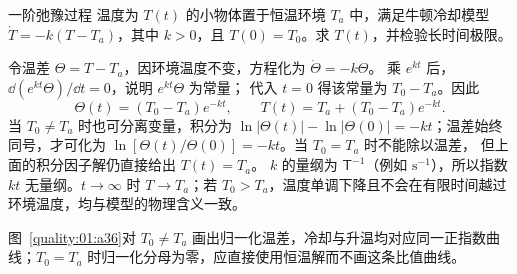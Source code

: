 \begin{origexamplebox}{一阶弛豫过程}
温度为 $T(t)$ 的小物体置于恒温环境 $T_a$ 中，满足牛顿冷却模型
$\dot T=-k(T-T_a)$，其中 $k>0$，且 $T(0)=T_0$。求 $T(t)$，并检验长时间极限。

\end{origexamplebox}
\begin{xesolution}
令温差 $\Theta=T-T_a$，因环境温度不变，方程化为 $\dot\Theta=-k\Theta$。
乘 $e^{kt}$ 后，$\dd(e^{kt}\Theta)/\dd t=0$，说明 $e^{kt}\Theta$ 为常量；
代入 $t=0$ 得该常量为 $T_0-T_a$。因此
\[
 \Theta(t)=(T_0-T_a)e^{-kt},\qquad
 \boxed{T(t)=T_a+(T_0-T_a)e^{-kt}}.
\]
当 $T_0\ne T_a$ 时也可分离变量，积分为
$\ln|\Theta(t)|-\ln|\Theta(0)|=-kt$；温差始终同号，才可化为
$\ln[\Theta(t)/\Theta(0)]=-kt$。当 $T_0=T_a$ 时不能除以温差，
但上面的积分因子解仍直接给出 $T(t)=T_a$。
$k$ 的量纲为 $\mathsf T^{-1}$（例如 $\mathrm{s^{-1}}$），所以指数 $kt$ 无量纲。$t\to\infty$ 时 $T\to T_a$；若 $T_0>T_a$，温度单调下降且不会在有限时间越过环境温度，均与模型的物理含义一致。


图~\ref{quality:01:a36}对 $T_0\ne T_a$ 画出归一化温差，冷却与升温均对应同一正指数曲线；$T_0=T_a$ 时归一化分母为零，应直接使用恒温解而不画这条比值曲线。
\end{xesolution}

\endgroup
